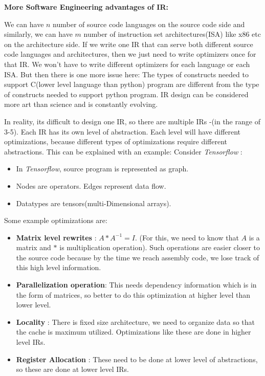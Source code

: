\textbf{More Software Engineering advantages of IR:}

We can have $n$ number of source code languages on the source code side and  similarly, we can have $m$ number of instruction set architectures(ISA) like x86 etc on the architecture side. If we write one IR that can serve both different source code languages and architectures, then we just need to write optimizers once for that IR. We won't have to write different optimizers for each language or each ISA. 
But then there is one more issue here: The types of constructs needed to support C(lower level language than python) program are different from the type of constructs needed to support python program. IR design can be considered more art than science and is constantly evolving. 

In reality, its difficult to design one IR, so there are multiple IRs -(in the range of 3-5). Each IR has its own level of abstraction. Each level will have different optimizations, because different types of optimizations require different abstractions. This can be explained with an example: 
Consider \emph{Tensorflow} :
\begin{itemize}
    \item In \emph{Tensorflow}, source program is represented as graph.
    \item Nodes are operators. Edges represent data flow.
    \item Datatypes are tensors(multi-Dimensional arrays).
\end{itemize}

Some example optimizations are:
\begin{itemize}
    \item  \textbf{Matrix level rewrites} : $A*A^{-1} = I$. (For this, we need to know that $A$ is a matrix and $*$ is multiplication operation). Such operations are easier closer to the source code because by the time we reach assembly code, we lose track of this high level information.
    \item \textbf{Parallelization operation}:  This needs dependency information which is in the form of matrices, so better to do this optimization at higher level than lower level.
    \item \textbf{Locality} : There is fixed size architecture, we need to organize data so that the cache is maximum utilized. Optimizations like these are done in higher level IRs.
    \item \textbf{Register Allocation} : These need to be done at lower level of abstractions, so these are done at lower level IRs. 
\end{itemize}
